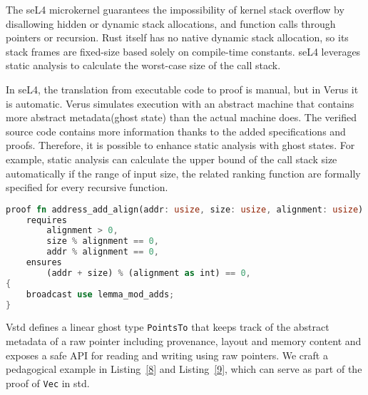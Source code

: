 \documentclass[conference]{IEEEtran}
\begin{document}
The seL4\cite{sel4} microkernel guarantees the impossibility of kernel stack overflow by disallowing hidden or dynamic stack allocations, and function calls through pointers or recursion. Rust itself has no native dynamic stack allocation, so its stack frames are fixed-size based solely on compile-time constants. seL4 leverages static analysis to calculate the worst-case size of the call stack. 

In seL4, the translation from executable code to proof is manual, but in Verus it is automatic. Verus simulates execution with an abstract machine that contains more abstract metadata(ghost state) than the actual machine does. The verified source code contains more information thanks to the added specifications and proofs. Therefore, it is possible to enhance static analysis with ghost states. For example, static analysis can calculate the upper bound of the call stack size automatically if the range of input size, the related ranking function are formally specified for every recursive function. 

\begin{lstlisting}[float,language=Rust,style=colouredRust, caption={Proving pointer addition preserves alignment with modulo arithmetics}, label = {8}]
proof fn address_add_align(addr: usize, size: usize, alignment: usize)
    requires
        alignment > 0,
        size % alignment == 0,
        addr % alignment == 0,
    ensures
        (addr + size) % (alignment as int) == 0,
{
    broadcast use lemma_mod_adds;
}
\end{lstlisting}

Vstd defines a linear ghost type \texttt{PointsTo} that keeps track of the abstract metadata of a raw pointer including provenance, layout and memory content and exposes a safe API for reading and writing using raw pointers. We craft a pedagogical example in Listing~\ref{8} and Listing~\ref{9}, which can serve as part of the proof of \texttt{Vec} in std.
\end{document}
